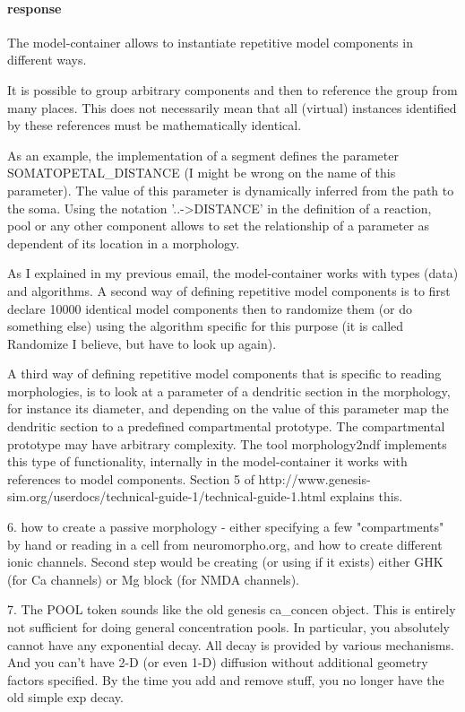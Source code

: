 \documentclass[12pt]{article}
\begin{document}
\paragraph{response} The model-container allows to instantiate
repetitive model components in different ways.

It is possible to group arbitrary components and then to reference the
group from many places.  This does not necessarily mean that all
(virtual) instances identified by these references must be
mathematically identical.

As an example, the implementation of a segment defines the parameter
SOMATOPETAL\_DISTANCE (I might be wrong on the name of this
parameter).  The value of this parameter is dynamically inferred from
the path to the soma.  Using the notation '..->DISTANCE' in the
definition of a reaction, pool or any other component allows to set
the relationship of a parameter as dependent of its location in a
morphology.

As I explained in my previous email, the model-container works with
types (data) and algorithms.  A second way of defining repetitive
model components is to first declare 10000 identical model components
then to randomize them (or do something else) using the algorithm
specific for this purpose (it is called Randomize I believe, but have
to look up again).

A third way of defining repetitive model components that is specific
to reading morphologies, is to look at a parameter of a dendritic
section in the morphology, for instance its diameter, and depending on
the value of this parameter map the dendritic section to a predefined
compartmental prototype.  The compartmental prototype may have
arbitrary complexity.  The tool morphology2ndf implements this type of
functionality, internally in the model-container it works with
references to model components.  Section 5 of
http://www.genesis-sim.org/userdocs/technical-guide-1/technical-guide-1.html
explains this.


6. how to create a passive morphology - either specifying a few
"compartments" by hand or reading in a cell from neuromorpho.org, and
how to create different ionic channels.  Second step would be creating
(or using if it exists) either GHK (for Ca channels) or Mg block (for
NMDA channels).


7. The POOL token sounds like the old genesis ca\_concen object.  This
is entirely not sufficient for doing general concentration pools.  In
particular, you absolutely cannot have any exponential decay.  All
decay is provided by various mechanisms.  And you can't have 2-D (or
even 1-D) diffusion without additional geometry factors specified.  By
the time you add and remove stuff, you no longer have the old simple
exp decay.
\end{document}
